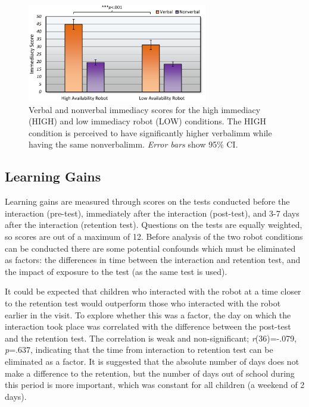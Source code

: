 \begin{figure}[t!]
    \centering
    \includegraphics[width=0.7\textwidth]{images/ch9_ImmediacyGraph.pdf}
    \caption{Verbal and nonverbal immediacy scores for the high immediacy (HIGH) and low immediacy robot (LOW) conditions. The HIGH condition is perceived to have significantly higher \gls{verbalimm} while having the same \gls{nonverbalimm}. \textit{Error bars} show 95\% CI.} 
    \label{fig:immgraph}
\end{figure}

\subsection{Learning Gains}\label{sec:verbal-res-learn}
Learning gains are measured through scores on the tests conducted before the interaction (pre-test), immediately after the interaction (post-test), and 3-7 days after the interaction (retention test). Questions on the tests are equally weighted, so scores are out of a maximum of 12. Before analysis of the two robot conditions can be conducted there are some potential confounds which must be eliminated as factors: the differences in time between the interaction and retention test, and the impact of exposure to the test (as the same test is used).

It could be expected that children who interacted with the robot at a time closer to the retention test would outperform those who interacted with the robot earlier in the visit. To explore whether this was a factor, the day on which the interaction took place was correlated with the difference between the post-test and the retention test. The correlation is weak and non-significant; \textit{r}(36)=-.079, \textit{p}=.637, indicating that the time from interaction to retention test can be eliminated as a factor. It is suggested that the absolute number of days does not make a difference to the retention, but the number of days out of school during this period is more important, which was constant for all children (a weekend of 2 days).

